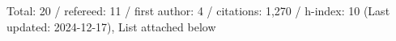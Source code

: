 Total: 20 / refereed: 11 / first author: 4 / citations: 1,270 / h-index: 10 (Last updated: 2024-12-17), List attached below